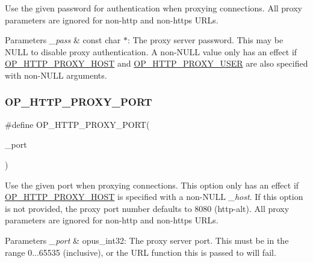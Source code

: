 Use the given password for authentication when proxying connections. All proxy parameters are ignored for non-\/http and non-\/https U\+R\+Ls. 
\begin{DoxyParams}{Parameters}
{\em \+\_\+pass} & const char $\ast$\+: The proxy server password. This may be {\ttfamily N\+U\+LL} to disable proxy authentication. A non-\/{\ttfamily N\+U\+LL} value only has an effect if \hyperlink{group__url__options_gab3b517acdb74c0d0b51800af86a58876}{O\+P\+\_\+\+H\+T\+T\+P\+\_\+\+P\+R\+O\+X\+Y\+\_\+\+H\+O\+ST} and \hyperlink{group__url__options_gaf0ce8d761ff48697fa0c44a62a445842}{O\+P\+\_\+\+H\+T\+T\+P\+\_\+\+P\+R\+O\+X\+Y\+\_\+\+U\+S\+ER} are also specified with non-\/{\ttfamily N\+U\+LL} arguments. \\
\hline
\end{DoxyParams}
\mbox{\label{group__url__options_ga838d23878f4135691684203baa75ed0c}} 
\subsubsection{\texorpdfstring{O\+P\+\_\+\+H\+T\+T\+P\+\_\+\+P\+R\+O\+X\+Y\+\_\+\+P\+O\+RT}{OP\_HTTP\_PROXY\_PORT}}
{\footnotesize\ttfamily \#define O\+P\+\_\+\+H\+T\+T\+P\+\_\+\+P\+R\+O\+X\+Y\+\_\+\+P\+O\+RT(\begin{DoxyParamCaption}\item[{}]{\+\_\+port }\end{DoxyParamCaption})}

Use the given port when proxying connections. This option only has an effect if \hyperlink{group__url__options_gab3b517acdb74c0d0b51800af86a58876}{O\+P\+\_\+\+H\+T\+T\+P\+\_\+\+P\+R\+O\+X\+Y\+\_\+\+H\+O\+ST} is specified with a non-\/{\ttfamily N\+U\+LL} {\itshape \+\_\+host}. If this option is not provided, the proxy port number defaults to 8080 (http-\/alt). All proxy parameters are ignored for non-\/http and non-\/https U\+R\+Ls. 
\begin{DoxyParams}{Parameters}
{\em \+\_\+port} & {\ttfamily opus\+\_\+int32}\+: The proxy server port. This must be in the range 0...65535 (inclusive), or the U\+RL function this is passed to will fail. \\
\hline
\end{DoxyParams}
\mbox{\label{group__url__options_gaf0ce8d761ff48697fa0c44a62a445842}} 
